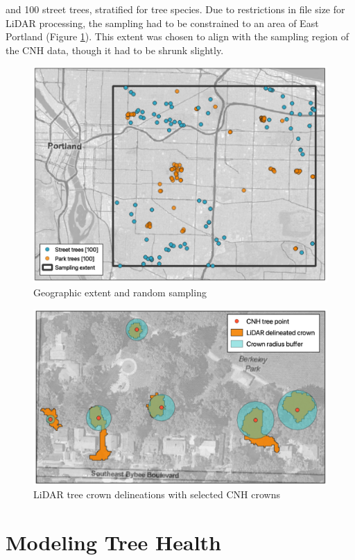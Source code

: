 \documentclass[12pt,twoside]{reedthesis}
\begin{document}
and 100 street trees, stratified for tree species. Due to restrictions
in file size for LiDAR processing, the sampling had to be constrained to
an area of East Portland (Figure \ref{fig:clip-extent}). This extent
was chosen to align with the sampling region of the CNH data, though it
had to be shrunk slightly.
\begin{figure}

{\centering \includegraphics[width=0.8\linewidth]{figure/extent_and_samples} 

}

\caption{Geographic extent and random sampling}\label{fig:clip-extent}
\end{figure}
\begin{figure}

{\centering \includegraphics[width=0.8\linewidth]{figure/layered_outputs} 

}

\caption{LiDAR tree crown delineations with selected CNH crowns}\label{fig:unnamed-chunk-5}
\end{figure}
\hypertarget{modeling-tree-health}{%
\section{Modeling Tree Health}\label{modeling-tree-health}}
\end{document}
